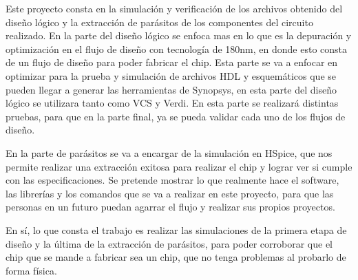 

Este proyecto consta en la simulación y verificación de los archivos obtenido del diseño lógico y la extracción de parásitos de los componentes del circuito realizado. 
En la parte del diseño lógico se enfoca mas en lo que es la depuración y optimización en el flujo de diseño con tecnología de 180nm, en donde esto consta de un flujo de diseño para poder fabricar el chip. Esta parte se va a enfocar en optimizar para la prueba y simulación de archivos HDL y esquemáticos que se pueden llegar a generar las herramientas de Synopsys, en esta parte del diseño lógico se utilizara tanto como VCS y Verdi.
En esta parte se realizará distintas pruebas, para que en la parte final, ya se pueda validar cada uno de los flujos de diseño.

En la parte de parásitos se va a encargar de la simulación en HSpice, que nos permite realizar una extracción exitosa para realizar el chip y lograr ver si cumple con las especificaciones. Se pretende mostrar lo que realmente hace el software, las librerías y los comandos que se va a realizar en este proyecto, para que las personas en un futuro puedan agarrar el flujo y realizar sus propios proyectos.

En sí, lo que consta el trabajo es realizar las simulaciones de la primera etapa de diseño y la última de la extracción de parásitos, para poder corroborar que el chip que se mande a fabricar sea un chip, que no tenga problemas al probarlo de forma física.
